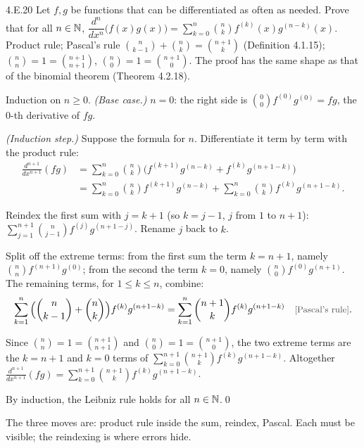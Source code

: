 \begin{bookex}[essential]{4.E.20}
Let $f,g$ be functions that can be differentiated as often as needed. Prove that for all $n\in\mathbb{N}$,
$\dfrac{d^n}{dx^n}\big(f(x)g(x)\big)=\displaystyle\sum_{k=0}^n\binom nkf^{(k)}(x)g^{(n-k)}(x)$.
\solution
\given Product rule; Pascal's rule $\binom n{k-1}+\binom nk=\binom{n+1}k$ (Definition 4.1.15); $\binom nn=1=\binom{n+1}{n+1}$, $\binom n0=1=\binom{n+1}0$. The proof has the same shape as that of the binomial theorem (Theorem 4.2.18).
\begin{steps}
\item Induction on $n\ge0$. \emph{(Base case.)} $n=0$: the right side is $\binom00f^{(0)}g^{(0)}=fg$, the $0$-th derivative of $fg$.
\item \emph{(Induction step.)} Suppose the formula for $n$. Differentiate it term by term with the product rule:
\begin{align*}
\frac{d^{n+1}}{dx^{n+1}}(fg)&=\sum_{k=0}^n\binom nk\Big(f^{(k+1)}g^{(n-k)}+f^{(k)}g^{(n+1-k)}\Big)\\
&=\sum_{k=0}^n\binom nkf^{(k+1)}g^{(n-k)}+\sum_{k=0}^n\binom nkf^{(k)}g^{(n+1-k)} .
\end{align*}
\item Reindex the first sum with $j=k+1$ (so $k=j-1$, $j$ from $1$ to $n+1$): $\sum_{j=1}^{n+1}\binom n{j-1}f^{(j)}g^{(n+1-j)}$. Rename $j$ back to $k$.
\item Split off the extreme terms: from the first sum the term $k=n+1$, namely $\binom nnf^{(n+1)}g^{(0)}$; from the second the term $k=0$, namely $\binom n0f^{(0)}g^{(n+1)}$. The remaining terms, for $1\le k\le n$, combine:
\[
\sum_{k=1}^n\Big(\binom n{k-1}+\binom nk\Big)f^{(k)}g^{(n+1-k)}=\sum_{k=1}^n\binom{n+1}kf^{(k)}g^{(n+1-k)} \why{Pascal's rule}.
\]
\item Since $\binom nn=1=\binom{n+1}{n+1}$ and $\binom n0=1=\binom{n+1}0$, the two extreme terms are the $k=n+1$ and $k=0$ terms of $\sum_{k=0}^{n+1}\binom{n+1}kf^{(k)}g^{(n+1-k)}$. Altogether $\frac{d^{n+1}}{dx^{n+1}}(fg)=\sum_{k=0}^{n+1}\binom{n+1}kf^{(k)}g^{(n+1-k)}$.
\end{steps}
\conclusion By induction, the Leibniz rule holds for all $n\in\mathbb{N}$.\qed
\begin{compare}
\item The three moves are: product rule inside the sum, reindex, Pascal. Each must be visible; the reindexing is where errors hide.
\end{compare}
\end{bookex}

